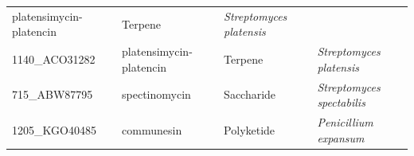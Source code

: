 \documentclass[12pt,twoside]{reedthesis}
\begin{document}
\begin{longtable}[]{@{}llll@{}}
\begin{minipage}[t]{0.20\columnwidth}
  platensimycin- platencin\strut
  \end{minipage} & \begin{minipage}[t]{0.15\columnwidth}\raggedright\strut
  Terpene\strut
  \end{minipage} & \begin{minipage}[t]{0.34\columnwidth}\raggedright\strut
  \emph{Streptomyces platensis}\strut
  \end{minipage}\tabularnewline
  \begin{minipage}[t]{0.19\columnwidth}\raggedright\strut
  1140\_ACO31282\strut
  \end{minipage} & \begin{minipage}[t]{0.20\columnwidth}\raggedright\strut
  platensimycin- platencin\strut
  \end{minipage} & \begin{minipage}[t]{0.15\columnwidth}\raggedright\strut
  Terpene\strut
  \end{minipage} & \begin{minipage}[t]{0.34\columnwidth}\raggedright\strut
  \emph{Streptomyces platensis}\strut
  \end{minipage}\tabularnewline
  \begin{minipage}[t]{0.19\columnwidth}\raggedright\strut
  715\_ABW87795\strut
  \end{minipage} & \begin{minipage}[t]{0.20\columnwidth}\raggedright\strut
  spectinomycin\strut
  \end{minipage} & \begin{minipage}[t]{0.15\columnwidth}\raggedright\strut
  Saccharide\strut
  \end{minipage} & \begin{minipage}[t]{0.34\columnwidth}\raggedright\strut
  \emph{Streptomyces spectabilis}\strut
  \end{minipage}\tabularnewline
  \begin{minipage}[t]{0.19\columnwidth}\raggedright\strut
  1205\_KGO40485\strut
  \end{minipage} & \begin{minipage}[t]{0.20\columnwidth}\raggedright\strut
  communesin\strut
  \end{minipage} & \begin{minipage}[t]{0.15\columnwidth}\raggedright\strut
  Polyketide\strut
  \end{minipage} & \begin{minipage}[t]{0.34\columnwidth}\raggedright\strut
  \emph{Penicillium expansum}\strut

\end{minipage}
\end{longtable}
\end{document}
